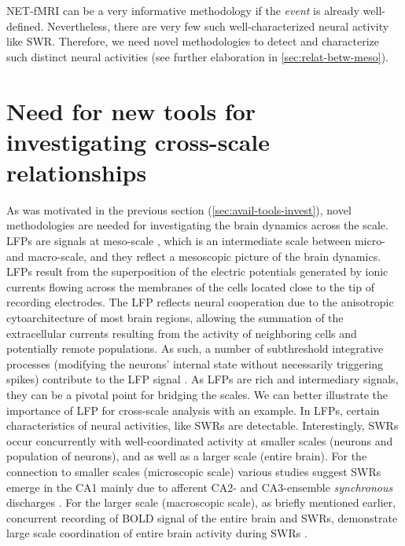 NET-fMRI can be a very informative methodology if the \emph{event} is already well-defined.
Nevertheless, there are very few such well-characterized neural activity like SWR.
Therefore, we need novel methodologies to detect and characterize such distinct neural activities
(see further elaboration in \autoref{sec:relat-betw-meso}).


\section{Need for new tools for investigating cross-scale relationships} \label{sec:need-new-tools}

As was motivated in the previous section (\autoref{sec:avail-tools-invest}),
novel methodologies are needed for investigating the brain dynamics across the scale.
LFPs are signals at meso-scale  \cite{liljenstroemMesoscopicBrainDynamics2012}, 
which is an intermediate scale between micro- and macro-scale,
and they reflect a mesoscopic picture of the brain dynamics.
LFPs result from the superposition of the electric potentials generated by ionic currents flowing across the membranes of the cells located close to the tip of recording electrodes.
The LFP reflects neural cooperation due to the anisotropic cytoarchitecture of most brain regions,
allowing the summation of the extracellular currents resulting from the activity of neighboring cells and potentially remote populations. 
As such, a number of subthreshold integrative processes 
(\ie modifying the neurons' internal state without necessarily triggering spikes) 
contribute to the LFP signal
\cite{buzsakiOriginExtracellularFields2012,liljenstroemMesoscopicBrainDynamics2012,einevollModellingAnalysisLocal2013,herrerasLocalFieldPotentials2016,pesaranInvestigatingLargescaleBrain2018}.
As LFPs are rich and intermediary signals, they can be a pivotal point for bridging the scales. 
We can better illustrate the importance of LFP for cross-scale analysis with an example.
In LFPs, certain characteristics of neural activities, like
SWRs are detectable.
Interestingly, SWRs occur concurrently with well-coordinated activity at smaller scales (neurons and population of neurons),
and as well as a larger scale (entire brain).
For the connection to smaller scales (microscopic scale) various studies suggest SWRs emerge in the CA1 mainly due to afferent CA2- and CA3-ensemble \emph{synchronous} discharges \citep{csicsvariEnsemblePatternsHippocampal2000,csicsvariEnsemblePatternsHippocampal2000,olivaRoleHippocampalCA22016}.
For the larger scale (macroscopic scale), as briefly mentioned earlier, concurrent recording of BOLD signal of the entire brain and SWRs,
demonstrate large scale coordination of entire brain activity during SWRs \citep{logothetisHippocampalCorticalInteraction2012}.

